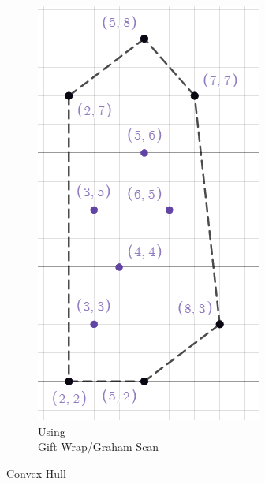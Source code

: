 \documentclass[a4paper,12pt]{article}
\begin{document}
\begin{figure}[h!]
\begin{subfigure}[b]{0.2\linewidth}
      \includegraphics[width=\linewidth]{cg_lab_4_output_gift_wrap.png}
      \caption{Using \\Gift Wrap/Graham Scan}
    \end{subfigure}
    \caption{Convex Hull}
    \label{fig:convex_hull}
  \end{figure}

  \vspace{1cm}
\end{document}
